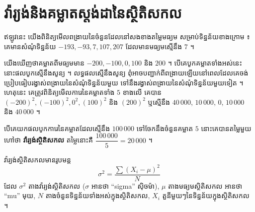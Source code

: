 \section{វ៉ារ្យង់និងគម្លាតស្តង់ដានៃស្ថិតិសកល}
ឥឡូវនេះ យើងពិនិត្យមើលពង្រាយនៃចំនួនដែលនៅសងខាងតម្លៃមធ្យម សម្រាប់ទិន្នន័យខាងក្រោម ៖ គេមានសំណុំទិន្នន័យ $-193, -93, 7, 107, 207$ ដែលមានមធ្យមស្មើនឹង $7$ ។
\begin{center}
\end{center}
យើងឃើញថាគម្លាតពីមធ្យមមាន $-200, -100, 0, 100$ និង $200$ ។ បើគេបូកគម្លាតទាំងអស់នេះ នោះផលបូកស្មើនឹងសូន្យ ។ លទ្ធផលស្មើនឹងសូន្យ ពុំអាចបញ្ជាក់ពីពង្រាយឡើយនៅពេលដែលគេចង់ប្រៀបធៀបរង្វាស់ពង្រាយនៃសំណុំទិន្នន័យមួយ ទៅនឹងរង្វាស់ពង្រាយនៃសំណុំទិន្នន័យមួយទៀត ។ ហេតុនេះ គេត្រូវពិនិត្យមើលការេនៃគម្លាតទាំង $5$ ខាងលើ គេបាន $(-200)^2, (-100)^2, 0^2, (100)^2$ និង $(200)^2$ ឬស្មើនឹង $40\,000$, $10\,000$, $0$, $10\,000$ និង $40\,000$ ។

បើគេយកផលបូកការេនៃគម្លាតដែលស្មើនឹង $100\,000$ ទៅចែកនឹងចំនួនគម្លាត $5$ នោះគេបានតម្លៃមួយហៅថា \textbf{វ៉ារ្យង់ស្ថិតិសកល} តម្លៃនោះគឺ $\dfrac{100\,000}{5} = 20\,000$ ។

\begin{formulaBox}[ជាទូទៅ]
វ៉ារ្យង់ស្ថិតិសកលមានរូបមន្ត
\[
\sigma^2 = \frac{\sum(X_i - \mu)^2}{N}
\]
ដែល $\sigma^2$ តាងវ៉ារ្យង់ស្ថិតិសកល ($\sigma$ អានថា “sigma” ស៊ិចម៉ា), $\mu$ តាងមធ្យមស្ថិតិសកល អានថា “mu” មុយ, $N$ តាងចំនួនទិន្នន័យទាំងអស់ក្នុងស្ថិតិសកល, $X_i$ តួនីមួយៗនៃទិន្នន័យក្នុងស្ថិតិសកល ។
\end{formulaBox}


